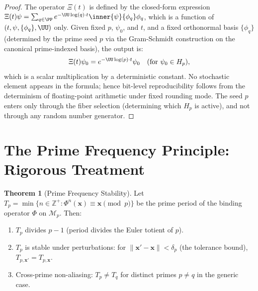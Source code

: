 \documentclass[12pt,letterpaper]{article}
\theoremstyle{definition}
\newtheorem{theorem}{Theorem}[section]
\theoremstyle{remark}
\begin{document}
\begin{proof}
The operator $\Xi(t)$ is defined by the closed-form expression
$\Xi(t)\psi = \sum_{q\in\PP} e^{-\UU\log(q)\cdot t}\inner{\psi}{\phi_q}\phi_q$,
which is a function of $(t, \psi, \{\phi_q\}, \UU)$ only.
Given fixed $p$, $\psi_0$, and $t$, and a fixed orthonormal basis
$\{\phi_q\}$ (determined by the prime seed $p$ via the Gram-Schmidt
construction on the canonical prime-indexed basis), the output is:
\[
  \Xi(t)\psi_0 = e^{-\UU\log(p)\cdot t}\psi_0
  \quad (\text{for }\psi_0 \in H_p),
\]
which is a scalar multiplication by a deterministic constant.
No stochastic element appears in the formula; hence bit-level reproducibility
follows from the determinism of floating-point arithmetic under fixed
rounding mode. The seed $p$ enters only through the fiber selection
(determining which $H_p$ is active), and not through any random number generator.
\end{proof}

\section{The Prime Frequency Principle: Rigorous Treatment}
\label{sec:pfp_proof}

\begin{theorem}[Prime Frequency Stability]
\label{thm:pfp}
Let $T_p = \min\{n\in\mathbb{Z}^+ : \Phi^n(\mathbf{x}) \equiv \mathbf{x} \pmod{p}\}$
be the prime period of the binding operator $\Phi$ on $\mathcal{M}_p$.
Then:
\begin{enumerate}[label=(\roman*),noitemsep]
  \item $T_p$ divides $p - 1$ (period divides the Euler totient of $p$).
  \item $T_p$ is stable under perturbations: for $\|\mathbf{x}' - \mathbf{x}\| < \delta_p$
        (the tolerance bound), $T_{p,\mathbf{x}'} = T_{p,\mathbf{x}}$.
  \item Cross-prime non-aliasing: $T_p \neq T_q$ for distinct primes $p \neq q$
        in the generic case.
\end{enumerate}
\end{theorem}
\end{document}
